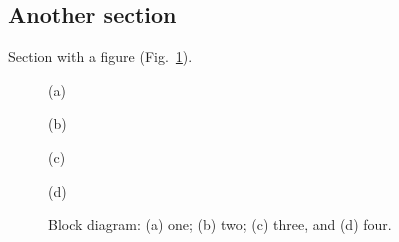 \documentclass[12pt,twoside]{article} %
\begin{document}
\subsection{Another section}  %

Section with a figure (Fig.~\ref{fig:example}).

\begin{figure}[htb]
%
  \begin{minipage}[t]{0.49\linewidth}\centering
    \medskip
    \centerline{(a)}
  \end{minipage}\hfill
%
  \begin{minipage}[t]{0.49\linewidth}\centering
    \medskip
    \centerline{(b)}
  \end{minipage}

  \bigskip

  \begin{minipage}[t]{0.49\linewidth}\centering
    \medskip
    \centerline{(c)}
  \end{minipage}\hfill
%
  \begin{minipage}[t]{0.49\linewidth}\centering
    \medskip
    \centerline{(d)}
  \end{minipage}
%
  \caption{Block diagram: (a) one; (b) two; (c) three, and (d) four.}
  \label{fig:example}
\end{figure}

\parskip=0pt
\parsep=0pt



\end{document}
